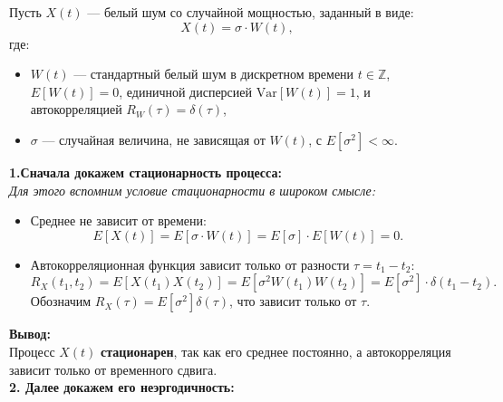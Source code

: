 {

Пусть \( X(t) \) — белый шум со случайной мощностью, заданный в виде:
\[
X(t) = \sigma \cdot W(t),
\]
где:
\begin{itemize}
\item \( W(t) \) — стандартный белый шум в дискретном времени \(t
  \in \mathbb{Z}\), \(
  E[W(t)] = 0 \), единичной дисперсией \( \text{Var}[W(t)] = 1 \),
  и автокорреляцией \( R_W(\tau) = \delta(\tau) \),
\item \( \sigma \) — случайная величина, не зависящая от \( W(t)
  \), с \( E[\sigma^2] < \infty \).
\end{itemize}

\textbf{1.Сначала докажем стационарность процесса:}\\
\textit{Для этого вспомним условие стационарности в широком смысле:}

\begin{itemize}
\item Среднее не зависит от времени:
  \[
    E[X(t)] = E[\sigma \cdot W(t)] = E[\sigma] \cdot E[W(t)] = 0.
  \]

\item Автокорреляционная функция зависит только от разности \( \tau
  = t_1 - t_2 \):
  \[
    R_X(t_1, t_2) = E[X(t_1)X(t_2)] = E[\sigma^2 W(t_1) W(t_2)] =
    E[\sigma^2] \cdot \delta(t_1 - t_2).
  \]
  Обозначим \( R_X(\tau) = E[\sigma^2] \delta(\tau) \), что зависит
  только от \( \tau \).
\end{itemize}

\textbf{Вывод:}\\
Процесс \( X(t) \) \textbf{стационарен}, так как его среднее
постоянно, а автокорреляция зависит только от временного сдвига.\\

\textbf{2. Далее докажем его неэргодичность:}\\

}
